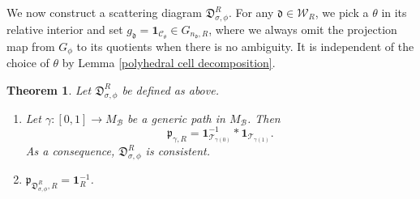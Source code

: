 \documentclass[a4paper,12pt]{amsart}
\numberwithin{equation}{section}
\newtheorem{theorem}{Theorem}[section]
\newcommand{\1}{\mathbf{1}}
\begin{document}
We now construct a scattering diagram $\mathfrak{D}_{\sigma,\phi}^R$. For any $\mathfrak{d}\in\mathcal{W}_R$, we pick a $\theta$ in its relative interior and set $g_{\mathfrak{d}}=\1_{\mathcal{C}_\theta}\in G_{n_{\mathfrak{d}},R}$, where we always omit the projection map from $G_{\phi}$ to its quotients when there is no ambiguity. It is independent of the choice of $\theta$ by Lemma \ref{polyhedral cell decomposition}.
\begin{theorem}
    Let $\mathfrak{D}_{\sigma,\phi}^R$ be defined as above.
    \begin{enumerate}
        \item Let $\gamma:[0,1]\rightarrow M_\mathcal{B}$ be a generic path in $M_\mathcal{B}$. Then
        \[\mathfrak{p}_{\gamma,R}=\1_{\mathcal{T}_{\gamma(0)}}^{-1}*\1_{\mathcal{T}_{\gamma(1)}}.\]
        As a consequence, $\mathfrak{D}_{\sigma,\phi}^R$ is consistent.
        \item $\mathfrak{p}_{\mathfrak{D}_{\sigma,\phi}^R,R}=\1_R^{-1}$.
    \end{enumerate}
\end{theorem}
\end{document}
